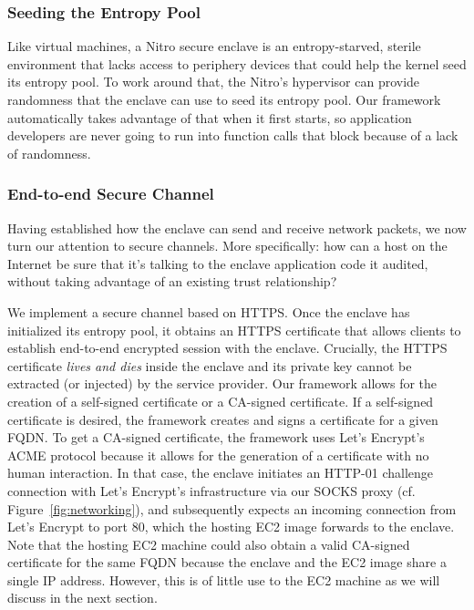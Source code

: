 \subsubsection{Seeding the Entropy Pool}
\label{sec:entropy}

Like virtual machines, a Nitro secure enclave is an entropy-starved, sterile environment that lacks access to periphery devices that could help the kernel seed its entropy pool.  To work around that, the Nitro's hypervisor can provide randomness that the enclave can use to seed its entropy pool.  Our framework automatically takes advantage of that when it first starts, so application developers are never going to run into function calls that block because of a lack of randomness.

\subsubsection{End-to-end Secure Channel}
\label{sec:cert}

Having established how the enclave can send and receive network packets, we now turn our attention to secure channels.  More specifically: how can a host on the Internet be sure that it's talking to the enclave application code it audited, without taking advantage of an existing trust relationship?

We implement a secure channel based on HTTPS.  Once the enclave has initialized its entropy pool, it obtains an HTTPS certificate that allows clients to establish end-to-end encrypted session with the enclave.  Crucially, the HTTPS certificate \emph{lives and dies} inside the enclave and its private key cannot be extracted (or injected) by the service provider.  Our framework allows for the creation of a self-signed certificate or a CA-signed certificate.  If a self-signed certificate is desired, the framework creates and signs a certificate for a given FQDN.  To get a CA-signed certificate, the framework uses Let's Encrypt's ACME protocol because it allows for the generation of a certificate with no human interaction.  In that case, the enclave initiates an HTTP-01 challenge connection with Let's Encrypt's infrastructure via our SOCKS proxy (cf. Figure~\ref{fig:networking}), and subsequently expects an incoming connection from Let's Encrypt to port 80, which the hosting EC2 image forwards to the enclave.  Note that the hosting EC2 machine could also obtain a valid CA-signed certificate for the same FQDN because the enclave and the EC2 image share a single IP address.  However, this is of little use to the EC2 machine as we will discuss in the next section.

